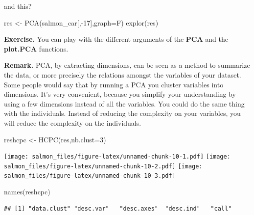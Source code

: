 \documentclass[
]{book}
\newenvironment{Shaded}{\begin{snugshade}}{\end{snugshade}}
\newcommand{\AttributeTok}[1]{\textcolor[rgb]{0.77,0.63,0.00}{#1}}
\newcommand{\DecValTok}[1]{\textcolor[rgb]{0.00,0.00,0.81}{#1}}
\newcommand{\FunctionTok}[1]{\textcolor[rgb]{0.00,0.00,0.00}{#1}}
\newcommand{\NormalTok}[1]{#1}
\newcommand{\OtherTok}[1]{\textcolor[rgb]{0.56,0.35,0.01}{#1}}
\newcommand{\SpecialCharTok}[1]{\textcolor[rgb]{0.00,0.00,0.00}{#1}}
\begin{document}
and this?

\begin{Shaded}
\begin{Highlighting}[]
\NormalTok{res }\OtherTok{\textless{}{-}} \FunctionTok{PCA}\NormalTok{(salmon\_car[,}\SpecialCharTok{{-}}\DecValTok{17}\NormalTok{],}\AttributeTok{graph=}\NormalTok{F)}
\FunctionTok{explor}\NormalTok{(res)}
\end{Highlighting}
\end{Shaded}

\textbf{Exercise. }
You can play with the different arguments of the \textbf{PCA} and the \textbf{plot.PCA} functions.

\textbf{Remark. }PCA, by extracting dimensions, can be seen as a method to summarize the data, or more precisely the relations amongst the variables of your dataset. Some people would say that by running a PCA you cluster variables into dimensions. It's very convenient, because you simplify your understanding by using a few dimensions instead of all the variables.
You could do the same thing with the individuals. Instead of reducing the complexity on your variables, you will reduce the complexity on the individuals.

\begin{Shaded}
\begin{Highlighting}[]
\NormalTok{reshcpc }\OtherTok{\textless{}{-}} \FunctionTok{HCPC}\NormalTok{(res,}\AttributeTok{nb.clust=}\DecValTok{3}\NormalTok{)}
\end{Highlighting}
\end{Shaded}

\texttt{[image: salmon\_files/figure-latex/unnamed-chunk-10-1.pdf]} \texttt{[image: salmon\_files/figure-latex/unnamed-chunk-10-2.pdf]} \texttt{[image: salmon\_files/figure-latex/unnamed-chunk-10-3.pdf]}

\begin{Shaded}
\begin{Highlighting}[]
\FunctionTok{names}\NormalTok{(reshcpc)}
\end{Highlighting}
\end{Shaded}

\begin{verbatim}
## [1] "data.clust" "desc.var"   "desc.axes"  "desc.ind"   "call"
\end{verbatim}

\begin{Shaded}
\end{Shaded}
\end{document}
